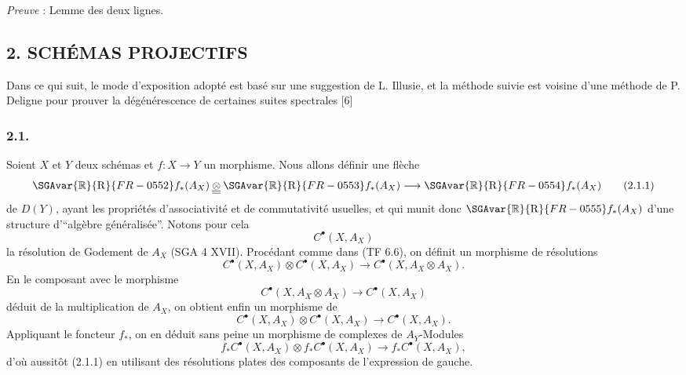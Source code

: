 \emph{Preuve} : Lemme des deux lignes.

\subsection*{2. SCHÉMAS PROJECTIFS}

Dans ce qui suit, le mode d'exposition adopté est basé sur une suggestion de L. Illusie, et la méthode suivie est voisine d'une méthode de P. Deligne pour prouver la dégénérescence de certaines suites spectrales [6]

\subsubsection*{2.1.}
Soient $X$ et $Y$ deux schémas et $f:X\to Y$ un morphisme. Nous allons définir une flèche
\[
\SGAvar{\mathbb{R}}{\mathrm{R}}{FR-0552} f_*(A_X)\mathbin{\underline{\underline{\otimes}}} \SGAvar{\mathbb{R}}{\mathrm{R}}{FR-0553} f_*(A_X)\longrightarrow \SGAvar{\mathbb{R}}{\mathrm{R}}{FR-0554} f_*(A_X)
\tag{2.1.1}
\]
de $D(Y)$, ayant les propriétés d'associativité et de commutativité usuelles, et qui munit donc $\SGAvar{\mathbb{R}}{\mathrm{R}}{FR-0555} f_*(A_X)$ d'une structure d'``algèbre généralisée''. Notons pour cela
\[
C^{\bullet}(X,A_X)
\]
la
résolution de Godement de $A_X$ (SGA 4 XVII). Procédant comme dans (TF 6.6), on définit un morphisme de résolutions
\[
C^{\bullet}(X,A_X)\otimes C^{\bullet}(X,A_X)\longrightarrow C^{\bullet}(X,A_X\otimes A_X).
\]
En le composant avec le morphisme
\[
C^{\bullet}(X,A_X\otimes A_X)\longrightarrow C^{\bullet}(X,A_X)
\]
déduit de la multiplication de $A_X$, on obtient enfin un morphisme de
\[
C^{\bullet}(X,A_X)\otimes C^{\bullet}(X,A_X)\longrightarrow C^{\bullet}(X,A_X).
\tag{2.1.2}
\]
Appliquant le foncteur $f_*$, on en déduit sans peine un morphisme de complexes de $A_Y$-Modules
\[
f_*C^{\bullet}(X,A_X)\otimes f_*C^{\bullet}(X,A_X)\longrightarrow f_*C^{\bullet}(X,A_X),
\]
d'où aussitôt (2.1.1) en utilisant des résolutions plates des composants de l'expression de gauche.

